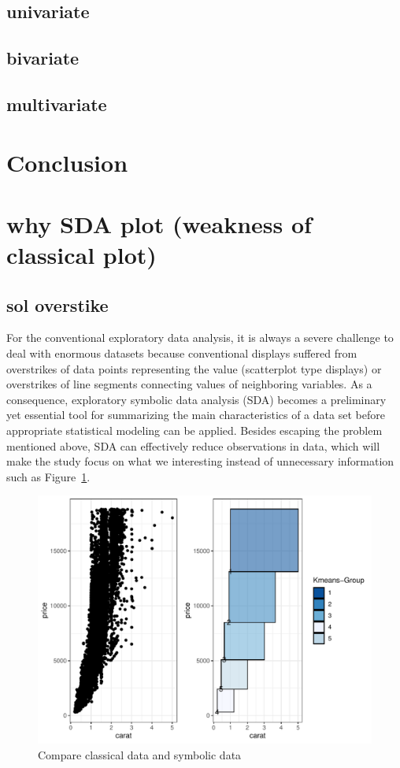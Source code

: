 \documentclass[article]{jss}
\begin{document}
\subsection{univariate}

\subsection{bivariate}

\subsection{multivariate}


\section{Conclusion}





\section{why SDA plot (weakness of classical plot)}
\subsection{sol overstike}
For the conventional exploratory data analysis, it is always a severe challenge to deal with enormous datasets because conventional displays suffered from overstrikes of data points representing the value (scatterplot type displays) or overstrikes of line segments connecting values of neighboring variables. As a consequence, exploratory symbolic data analysis (SDA) becomes a preliminary yet essential tool for summarizing the main characteristics of a data set before appropriate statistical modeling can be applied. Besides escaping the problem mentioned above, SDA can effectively reduce observations in data, which will make the study focus on what we interesting instead of unnecessary information such as Figure~\ref{fig:compare}.

\begin{figure}[H]
\centering
\includegraphics{ggESDA_Jiang&Wu_20210915-compare}
\caption{\label{fig:compare} Compare classical data and symbolic data}
\end{figure}
\end{document}
